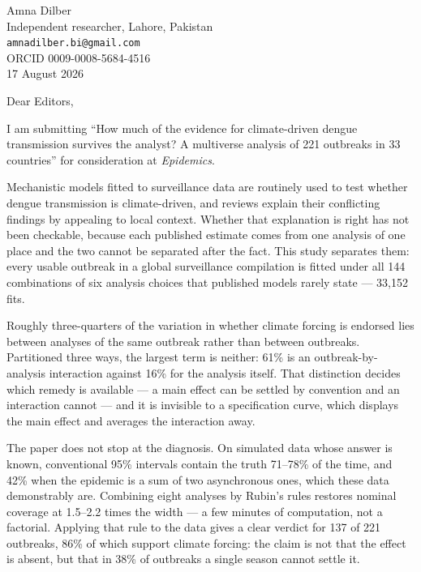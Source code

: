 \documentclass[11pt]{article}
\begin{document}
\begin{flushright}
Amna Dilber\\
Independent researcher, Lahore, Pakistan\\
\texttt{amnadilber.bi@gmail.com}\\
ORCID 0009-0008-5684-4516\\[0.4em]
17 August 2026
\end{flushright}

Dear Editors,

I am submitting ``How much of the evidence for climate-driven dengue
transmission survives the analyst? A multiverse analysis of 221 outbreaks in 33
countries'' for consideration at \emph{Epidemics}.

Mechanistic models fitted to surveillance data are routinely used to test
whether dengue transmission is climate-driven, and reviews explain their
conflicting findings by appealing to local context. Whether that explanation is
right has not been checkable, because each published estimate comes from one
analysis of one place and the two cannot be separated after the fact. This
study separates them: every usable outbreak in a global surveillance
compilation is fitted under all 144 combinations of six analysis choices that
published models rarely state --- 33{,}152 fits.

Roughly three-quarters of the variation in whether climate forcing is endorsed
lies between analyses of the same outbreak rather than between outbreaks.
Partitioned three ways, the largest term is neither: 61\% is an
outbreak-by-analysis interaction against 16\% for the analysis itself. That
distinction decides which remedy is available --- a main effect can be settled
by convention and an interaction cannot --- and it is invisible to a
specification curve, which displays the main effect and averages the
interaction away.

The paper does not stop at the diagnosis. On simulated data whose answer is
known, conventional 95\% intervals contain the truth 71--78\% of the time, and
42\% when the epidemic is a sum of two asynchronous ones, which these data
demonstrably are. Combining eight analyses by Rubin's rules restores nominal
coverage at 1.5--2.2 times the width --- a few minutes of computation, not a
factorial. Applying that rule to the data gives a clear verdict for 137 of 221
outbreaks, 86\% of which support climate forcing: the claim is not that the
effect is absent, but that in 38\% of outbreaks a single season cannot settle
it.
\end{document}
